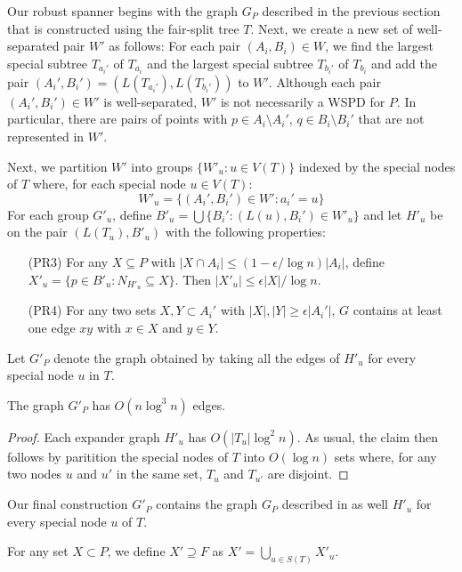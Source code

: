 \documentclass{patmorin}
\begin{document}
Our robust spanner begins with the graph $G_P$ described in the previous
section that is constructed using the fair-split tree $T$.  Next,
we create a new set of well-separated pair $W'$ as follows:  For each
pair $(A_i,B_i)\in W$, we find the largest special subtree $T_{a_i'}$
of $T_{a_i}$ and the largest special subtree $T_{b_i'}$ of $T_{b_i}$
and add the pair $(A_i',B_i')=(L(T_{a_i'}),L(T_{b_i'}))$ to $W'$.
Although each pair $(A_i',B_i')\in W'$ is well-separated, $W'$ is not
necessarily a WSPD for $P$.  In particular, there are pairs of points
with $p\in A_i\setminus A_i'$, $q\in B_i\setminus B_i'$ that are not
represented in $W'$.

Next, we partition $W'$ into groups $\{W'_u: u\in V(T)\}$ indexed by
the special nodes of $T$ where, for each special node $u\in V(T)$:
\[
	W'_u = \{ (A_i',B_i')\in W' : a_i' = u \}
\]
For each group $G'_u$, define $B'_u=\bigcup\{B_i' : (L(u),B_i')\in
W'_u\}$ and let $H'_u$ be on the pair $(L(T_u), B'_u)$ with the following
properties: 
\begin{enumerate}
  \item[(PR3)] For any $X\subseteq P$ with $|X\cap A_i|\le
  (1-\epsilon/\log n)|A_i|$, define $X'_u = \{p\in B'_u: N_{H'_u}\subseteq
  X\}$.  Then $|X'_u|\le \epsilon|X|/\log n$.

  \item[(PR4)] For any two sets $X,Y\subset A_i'$ with $|X|,|Y|\ge
  \epsilon|A_i'|$, $G$ contains at least one edge $xy$ with $x\in X$
  and $y\in Y$.
\end{enumerate}

Let $G'_P$ denote the graph obtained by taking all the edges of $H'_u$ for every special node $u$ in $T$.

\begin{clm}
  The graph $G'_P$ has $O(n\log^3 n)$ edges.
\end{clm}

\begin{proof}
  Each expander graph $H'_u$ has $O(|T_u|\log^2 n)$.  As usual, the claim
  then follows by paritition the special nodes of $T$ into $O(\log n)$
  sets where, for any two nodes $u$ and $u'$ in the same set, $T_u$ and
  $T_{u'}$ are disjoint.
\end{proof}

Our final construction $G'_P$ contains the graph $G_P$ described in
 as well $H'_u$ for every special node $u$ of $T$.

For any set $X\subset P$, we define $X'\supseteq F$ as 
$X' = \bigcup_{u\in S(T)} X'_u$.
\end{document}
